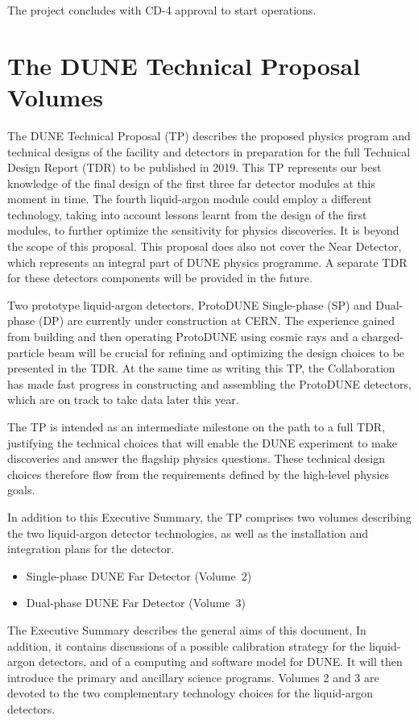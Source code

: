 The project concludes with CD-4 approval to start operations.

\section{The DUNE Technical Proposal Volumes}


The DUNE Technical Proposal (TP) describes the proposed physics program and 
technical designs of the facility and detectors in preparation for the full Technical Design Report (TDR)
to be published in 2019.  This TP represents our best knowledge of the final design of the first three far detector modules at this moment
in time. The fourth liquid-argon module could employ a different technology, taking into account lessons learnt from the design of the first modules, to further optimize the sensitivity for physics discoveries. It is beyond the scope of this proposal. This proposal does also not cover the Near Detector, which represents an integral part of DUNE physics programme. A separate TDR for these detectors components will be
provided in the future.

Two prototype liquid-argon detectors, ProtoDUNE Single-phase (SP) and Dual-phase (DP) are currently under construction at CERN.
The experience gained from building and then operating ProtoDUNE using cosmic rays and a charged-particle beam will be crucial for refining and optimizing the design choices to be presented in the TDR. At the same time as writing this TP, the Collaboration
has made fast progress in constructing and assembling the ProtoDUNE detectors, which
are on track to take data later this year. 

The TP is intended as an intermediate
milestone on the path to a full TDR, justifying the technical choices that will enable the DUNE experiment
to make discoveries and answer the flagship physics questions. These technical design choices therefore flow from
the requirements defined by the high-level physics goals.

In addition to this Executive Summary, the TP comprises two volumes describing the two liquid-argon detector 
technologies, as well as the installation and integration plans for the detector.
\begin{itemize}
 \item Single-phase DUNE Far Detector (Volume~2)
 \item Dual-phase DUNE Far Detector (Volume~3)
\end{itemize}
The Executive Summary describes the general aims of this document, In addition, it contains discussions of a possible calibration strategy for the liquid-argon detectors, and of a computing and software model for DUNE. It will then introduce
the primary and ancillary science programs. Volumes 2 and 3 are devoted to the two complementary technology choices for the
liquid-argon detectors. 

